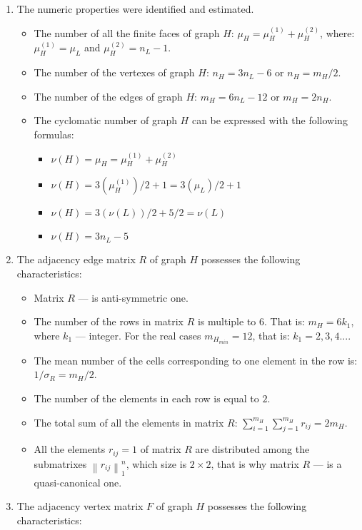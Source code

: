 \documentclass{amsart}
\theoremstyle{plain}
\numberwithin{equation}{section}
\begin{document}
\begin{enumerate}
\item 
The numeric properties were identified and estimated.

\begin {itemize}
\item	
The number of all the finite faces of graph $H$: $\mu_H=\mu_H^{(1)}+\mu_H^{(2)}$, where: $\mu_H^{(1)}=\mu_L$ and $\mu_H^{(2)}=n_L-1$.
\item	
The number of the vertexes of graph $H$: $n_H=3n_L-6$ or $n_H=m_H/2$.
\item	
The number of the edges of graph $H$: $m_H=6n_L-12$ or $m_H=2n_H$.
\item	
The cyclomatic number of graph $H$ can be expressed with the following formulas:

\begin {itemize}
\item 
$\nu(H)=\mu_H=\mu_H^{(1)}+\mu_H^{(2)}$
\item 
$\nu(H)=3(\mu_H^{(1)})/2 +1=3(\mu_L)/2 +1$
\item 
$\nu(H)=3(\nu(L))/2 +5/2=\nu(L)$
\item 
$\nu(H)=3n_L-5$
\end {itemize}
\end {itemize}

\item 
The adjacency edge matrix $R$ of graph $H$ possesses the following characteristics:

\begin {itemize} 
\item 
Matrix $R$ --- is anti-symmetric one.
\item
The number of the rows in matrix $R$ is multiple to $6$. That is: $m_H=6k_1$, where $k_1$ --- integer. For the real cases $m_{H_{min}}=12$, that is: $k_1=2,3,4...$.
\item 
The mean number of the cells corresponding to one element in the row is: $1/\sigma_R =m_H/2$.
\item 
The number of the elements in each row is equal to $2$.
\item 
The total sum of all the elements in matrix $R$: $\sum_{i=1}^{m_H} \sum_{j=1}^{m_H}r_{ij}=2m_H$.
\item 
All the elements $r_{ij}=1$ of matrix $R$ are distributed among the submatrixes $\left\|r_{ij}\right\|_1^n$, which size is $2 \times 2$, that is why matrix $R$ --- is a quasi-canonical one.
\end {itemize}

\item 
The adjacency vertex matrix $F$ of graph $H$ possesses the following characteristics:


\end{enumerate}
\end{document}
